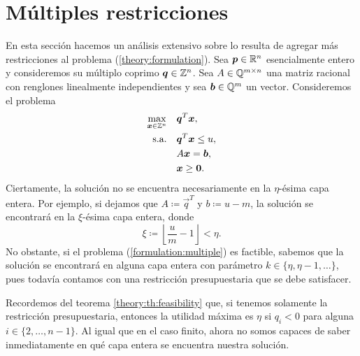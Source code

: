 \chapter{Múltiples restricciones}
\noindent
En esta sección hacemos un análisis extensivo sobre lo resulta de agregar más restricciones al
problema (\ref{theory:formulation}). Sea $\boldsymbol{p} \in \mathbb{R}^n$ esencialmente entero y consideremos su
múltiplo coprimo $\boldsymbol{q} \in \mathbb{Z}^n$. Sea $A \in \mathbb{Q}^{m \times n}$ una matriz racional con renglones
linealmente independientes y sea $\boldsymbol{b} \in \mathbb{Q}^m$ un vector. Consideremos el problema
\begin{subequations}
	\label{formulation:multiple}
	\begin{align}
		\max_{\boldsymbol{x} \in \mathbb{Z}^n} \quad
			& \boldsymbol{q}^T\boldsymbol{x}, \label{formulation:multiple:objective} \\
		\text{s.a.} \quad
			& \boldsymbol{q}^T\boldsymbol{x} \leq u, \label{formulation:multiple:constraint:budget} \\
			& A\boldsymbol{x} = \boldsymbol{b}, \label{formulation:multiple:constraints} \\
			& \boldsymbol{x} \geq \boldsymbol{0}. \nonumber
	\end{align}
\end{subequations}
Ciertamente, la solución no se encuentra necesariamente en la $\eta$-ésima capa entera. Por ejemplo,
si dejamos que $A \coloneq \vec{q}^T$ y $b \coloneq u - m$, la solución se encontrará en la
$\xi$-ésima capa entera, donde
\begin{equation*}
	\xi \coloneq \left\lfloor \frac{u}{m} - 1 \right\rfloor < \eta.
\end{equation*}
No obstante, si el problema (\ref{formulation:multiple}) es factible, sabemos que la solución se
encontrará en alguna capa entera con parámetro $k \in \lbrace \eta, \eta - 1, \ldots \rbrace$, pues
todavía contamos con una restricción presupuestaria que se debe satisfacer.
\begin{observation}
	Recordemos del teorema \ref{theory:th:feasibility} que, si tenemos solamente la restricción
	presupuestaria, entonces la utilidad máxima es $\eta$ si $q_i < 0$ para alguna $i \in
	\lbrace 2, \ldots, n - 1\rbrace$. Al igual que en el caso finito, ahora no somos capaces de
	saber inmediatamente en qué capa entera se encuentra nuestra solución.
\end{observation}

